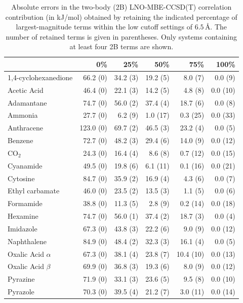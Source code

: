 \begin{table}[h]
\centering

\caption{\label{tab:x23_2b_energy_screening}Absolute errors in the two-body (2B) LNO-MBE-CCSD(T) correlation contribution (in kJ/mol) obtained by retaining the indicated percentage of largest-magnitude terms within the low cutoff settings of $6.5\,$\AA{}. The number of retained terms is given in parentheses. Only systems containing at least four 2B terms are shown.}
\begin{tabular}{lrrrrr}
\toprule
 & 0\% & 25\% & 50\% & 75\% & 100\% \\ 
\midrule
1,4-cyclohexanedione & 66.2 (0) & 34.2 (3) & 19.2 (5) & 8.0 (7) & 0.0 (9) \\
Acetic Acid & 46.4 (0) & 22.1 (3) & 14.2 (5) & 4.8 (8) & 0.0 (10) \\
Adamantane & 74.7 (0) & 56.0 (2) & 37.4 (4) & 18.7 (6) & 0.0 (8) \\
Ammonia & 27.7 (0) & 6.2 (9) & 1.0 (17) & 0.3 (25) & 0.0 (33) \\
Anthracene & 123.0 (0) & 69.7 (2) & 46.5 (3) & 23.2 (4) & 0.0 (5) \\
Benzene & 72.7 (0) & 48.2 (3) & 29.4 (6) & 14.0 (9) & 0.0 (12) \\
CO$_2$ & 24.3 (0) & 16.4 (4) & 8.6 (8) & 0.7 (12) & 0.0 (15) \\
Cyanamide & 49.5 (0) & 19.8 (6) & 6.1 (11) & 0.1 (16) & 0.0 (21) \\
Cytosine & 84.7 (0) & 35.9 (2) & 16.9 (4) & 4.3 (6) & 0.0 (7) \\
Ethyl carbamate & 46.0 (0) & 23.5 (2) & 13.5 (3) & 1.1 (5) & 0.0 (6) \\
Formamide & 38.8 (0) & 11.3 (5) & 2.8 (9) & 0.2 (14) & 0.0 (18) \\
Hexamine & 74.7 (0) & 56.0 (1) & 37.4 (2) & 18.7 (3) & 0.0 (4) \\
Imidazole & 67.3 (0) & 43.8 (3) & 22.2 (6) & 9.0 (9) & 0.0 (12) \\
Naphthalene & 84.9 (0) & 48.4 (2) & 32.3 (3) & 16.1 (4) & 0.0 (5) \\
Oxalic Acid $\alpha$ & 67.3 (0) & 38.1 (4) & 23.8 (7) & 10.4 (10) & 0.0 (13) \\
Oxalic Acid $\beta$ & 69.9 (0) & 36.8 (3) & 19.3 (6) & 8.0 (9) & 0.0 (12) \\
Pyrazine & 71.9 (0) & 33.1 (3) & 23.6 (5) & 9.5 (8) & 0.0 (10) \\
Pyrazole & 70.3 (0) & 39.5 (4) & 21.2 (7) & 3.0 (11) & 0.0 (14) \\

\end{tabular}
\end{table}
